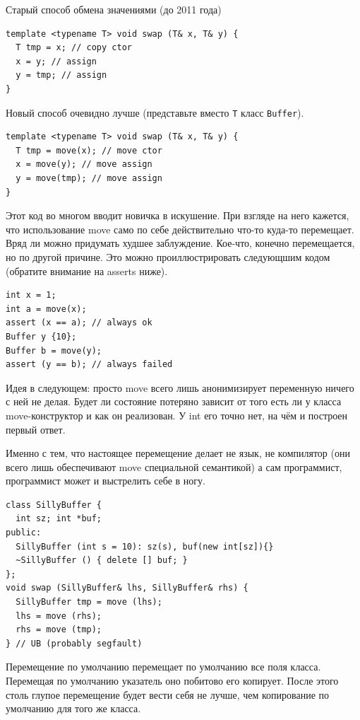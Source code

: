 \documentclass[a4paper,12pt,oneside]{article}
\begin{document}
Старый способ обмена значениями (до 2011 года)

\begin{lstlisting}
template <typename T> void swap (T& x, T& y) {
  T tmp = x; // copy ctor
  x = y; // assign
  y = tmp; // assign
} 
\end{lstlisting}

Новый способ очевидно лучше (представьте вместо \lstinline!T! класс \lstinline!Buffer!).

\begin{lstlisting}
template <typename T> void swap (T& x, T& y) {
  T tmp = move(x); // move ctor
  x = move(y); // move assign
  y = move(tmp); // move assign
} 
\end{lstlisting}

Этот код во многом вводит новичка в искушение. При взгляде на него кажется, что использование move само по себе действительно что-то куда-то перемещает. Вряд ли можно придумать худшее заблуждение. Кое-что, конечно перемещается, но по другой причине. Это можно проиллюстрировать следующшим кодом (обратите внимание на asserts ниже).

\begin{lstlisting}
int x = 1;
int a = move(x);
assert (x == a); // always ok
Buffer y {10};
Buffer b = move(y);
assert (y == b); // always failed
\end{lstlisting}

Идея в следующем: просто move всего лишь анонимизирует переменную ничего с ней не делая. Будет ли состояние потеряно зависит от того есть ли у класса move-конструктор и как он реализован. У int его точно нет, на чём и построен первый ответ.

Именно с тем, что настоящее перемещение делает не язык, не компилятор (они всего лишь обеспечивают move специальной семантикой) а сам программист, программист может и выстрелить себе в ногу.

\begin{lstlisting}
class SillyBuffer {
  int sz; int *buf;
public:
  SillyBuffer (int s = 10): sz(s), buf(new int[sz]){}
  ~SillyBuffer () { delete [] buf; }
};
void swap (SillyBuffer& lhs, SillyBuffer& rhs) {
  SillyBuffer tmp = move (lhs);
  lhs = move (rhs);
  rhs = move (tmp);
} // UB (probably segfault) 
\end{lstlisting}

Перемещение по умолчанию перемещает по умолчанию все поля класса. Перемещая по умолчанию указатель оно побитово его копирует. После этого столь глупое перемещение будет вести себя не лучше, чем копирование по умолчанию для того же класса.
\end{document}
